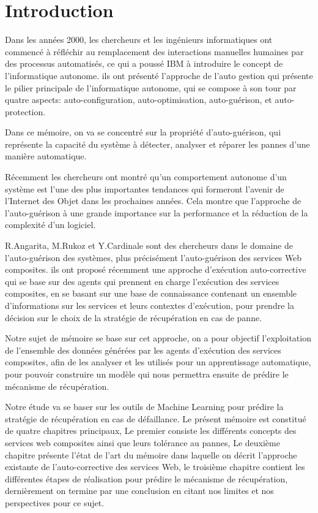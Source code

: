 \chapter*{Introduction}
\label{chap:introduction}

Dans les années 2000, les chercheurs et les ingénieurs informatiques ont commencé à réfléchir au remplacement des interactions manuelles humaines par des processus automatisés, ce qui a poussé IBM à introduire le concept de l'informatique autonome. ils ont présenté l'approche de l'auto gestion qui présente le pilier principale de l'informatique autonome, qui se compose à son tour par quatre aspects: auto-configuration, auto-optimisation, auto-guérison, et auto-protection.

Dans ce mémoire, on va se concentré sur la propriété d'auto-guérison, qui représente la capacité du système à détecter, analyser et réparer les pannes d'une manière automatique.

Récemment les chercheurs ont montré qu'un comportement autonome d'un système est l'une des plus importantes tendances qui formeront l'avenir de l'Internet des Objet dans les prochaines années. Cela montre que l'approche de l'auto-guérison à une grande importance sur la performance et la réduction de la complexité d'un logiciel.

R.Angarita, M.Rukoz et Y.Cardinale sont des chercheurs dans le domaine de l'auto-guérison des systèmes, plus précisément l'auto-guérison des services Web composites. ils ont proposé récemment une approche d'exécution auto-corrective qui se base sur des agents qui prennent en charge l'exécution des services composites, en se basant sur une base de connaissance contenant un ensemble d'informations sur les services et leurs contextes d'exécution, pour prendre la décision sur le choix de la stratégie de récupération en cas de panne.

Notre sujet de mémoire se base sur cet approche, on a pour objectif l'exploitation de l'ensemble des données générées par les agents d'exécution des services composites, afin de les analyser et les utilisés pour un apprentissage automatique, pour pouvoir construire un modèle qui nous permettra ensuite de prédire le mécanisme de récupération.

Notre étude va se baser sur les outils de Machine Learning pour prédire la stratégie de récupération en cas de défaillance.
Le présent mémoire est constitué de quatre chapitres principaux, Le premier consiste les différents concepts des services web composites ainsi que leurs tolérance au pannes, Le deuxième chapitre présente l'état de l'art du mémoire dans laquelle on décrit l'approche existante de l'auto-corrective des services Web, le troisième chapitre contient les différentes étapes de réalisation pour prédire le mécanisme de récupération, dernièrement on termine par une conclusion en citant nos limites et nos perspectives pour ce sujet.